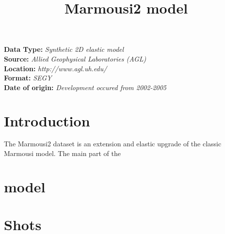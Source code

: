 \title{Marmousi2 model}
\author{}
\lstset{language=python,numbers=left,numberstyle=\tiny,showstringspaces=false}

\maketitle
\noindent
\textbf {Data Type:} \emph{Synthetic 2D elastic model}\\
\textbf {Source:} \emph{Allied Geophysical Laboratories (AGL)}\\
\textbf {Location:} \emph{http://www.agl.uh.edu/}\\
\textbf {Format:} \emph{SEGY} \\
\textbf{Date of origin:} \emph{Development occured from 2002-2005}\\

\section{Introduction}
The Marmousi2 dataset is an extension and elastic upgrade of the classic Marmousi model.  The main part of the  


\section{model}

\section{Shots}




